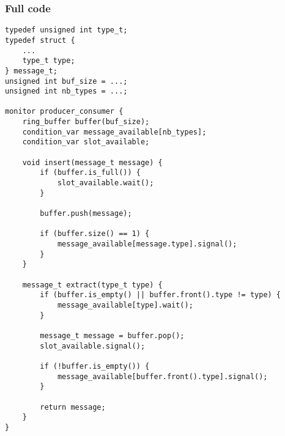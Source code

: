 \documentclass[a4paper, 12pt]{article}
\begin{document}
\subsubsection{Full code}
\begin{lstlisting}
typedef unsigned int type_t;
typedef struct {
    ...
    type_t type;
} message_t;
unsigned int buf_size = ...;
unsigned int nb_types = ...;

monitor producer_consumer {
    ring_buffer buffer(buf_size);
    condition_var message_available[nb_types];
    condition_var slot_available;

    void insert(message_t message) {
        if (buffer.is_full()) {
            slot_available.wait();
        }

        buffer.push(message);

        if (buffer.size() == 1) {
            message_available[message.type].signal();
        }
    }

    message_t extract(type_t type) {
        if (buffer.is_empty() || buffer.front().type != type) {
            message_available[type].wait();
        }

        message_t message = buffer.pop();
        slot_available.signal();

        if (!buffer.is_empty()) {
            message_available[buffer.front().type].signal();
        }

        return message;
    }
}
\end{lstlisting}
\end{document}
